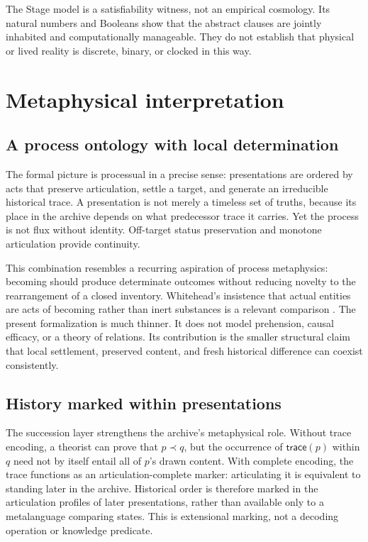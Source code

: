 \documentclass[11pt]{article}
\theoremstyle{definition}
\theoremstyle{remark}
\newcommand{\Trace}{\mathsf{trace}}
\begin{document}
The Stage model is a satisfiability witness, not an empirical cosmology. Its
natural numbers and Booleans show that the abstract clauses are jointly
inhabited and computationally manageable. They do not establish that physical
or lived reality is discrete, binary, or clocked in this way.

\section{Metaphysical interpretation}

\subsection{A process ontology with local determination}

The formal picture is processual in a precise sense: presentations are ordered
by acts that preserve articulation, settle a target, and generate an
irreducible historical trace. A presentation is not merely a timeless set of
truths, because its place in the archive depends on what predecessor trace it
carries. Yet the process is not flux without identity. Off-target status
preservation and monotone articulation provide continuity.

This combination resembles a recurring aspiration of process metaphysics:
becoming should produce determinate outcomes without reducing novelty to the
rearrangement of a closed inventory. Whitehead's insistence that actual
entities are acts of becoming rather than inert substances is a relevant
comparison \cite{Whitehead1978}. The present formalization is much thinner. It
does not model prehension, causal efficacy, or a theory of relations. Its
contribution is the smaller structural claim that local settlement, preserved
content, and fresh historical difference can coexist consistently.

\subsection{History marked within presentations}

The succession layer strengthens the archive's metaphysical role. Without
trace encoding, a theorist can prove that \(p\prec q\), but the occurrence of
\(\Trace(p)\) within \(q\) need not by itself entail all of \(p\)'s drawn
content. With complete encoding, the trace functions as an
articulation-complete marker: articulating it is equivalent to standing later
in the archive. Historical order is therefore marked in the articulation
profiles of later presentations, rather than available only to a metalanguage
comparing states. This is extensional marking, not a decoding operation or
knowledge predicate.
\end{document}
